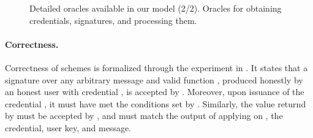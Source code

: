 {\begin{figure*}[htp!]
{\begin{minipage}[t]{.5\textwidth}
      \end{minipage}
      
    }

    \caption{Detailed oracles available in our model (2/2). Oracles for
      obtaining credentials, signatures, and processing them.}
    \label{fig:oracles2}
  \end{figure*}
}

\paragraph{Correctness.} %
Correctness of \UAS schemes is formalized through the experiment in
. It states that a signature over any arbitrary message
and valid function \feval {},
produced honestly by an honest user \uid with credential \cid, is accepted by
\Verify. Moreover, upon issuance of the credential \cid, it must have met the
conditions set by \fissue. Similarly, the value returnd by \Inspect must be
accepted by \Judge, and must match the output of applying \finsp on \feval, the
credential, user key, and message.

